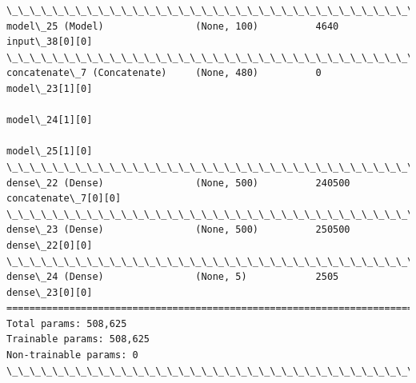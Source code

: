 \documentclass[11pt]{article}
\begin{document}
\begin{Verbatim}[commandchars=\\\{\}]
\_\_\_\_\_\_\_\_\_\_\_\_\_\_\_\_\_\_\_\_\_\_\_\_\_\_\_\_\_\_\_\_\_\_\_\_\_\_\_\_\_\_\_\_\_\_\_\_\_\_\_\_\_\_\_\_\_\_\_\_\_\_\_\_\_\_\_\_\_\_\_\_\_\_\_\_\_\_\_\_\_\_\_\_\_\_\_\_\_\_\_\_\_\_\_\_\_\_
model\_25 (Model)                (None, 100)          4640        input\_38[0][0]                   
\_\_\_\_\_\_\_\_\_\_\_\_\_\_\_\_\_\_\_\_\_\_\_\_\_\_\_\_\_\_\_\_\_\_\_\_\_\_\_\_\_\_\_\_\_\_\_\_\_\_\_\_\_\_\_\_\_\_\_\_\_\_\_\_\_\_\_\_\_\_\_\_\_\_\_\_\_\_\_\_\_\_\_\_\_\_\_\_\_\_\_\_\_\_\_\_\_\_
concatenate\_7 (Concatenate)     (None, 480)          0           model\_23[1][0]                   
                                                                 model\_24[1][0]                   
                                                                 model\_25[1][0]                   
\_\_\_\_\_\_\_\_\_\_\_\_\_\_\_\_\_\_\_\_\_\_\_\_\_\_\_\_\_\_\_\_\_\_\_\_\_\_\_\_\_\_\_\_\_\_\_\_\_\_\_\_\_\_\_\_\_\_\_\_\_\_\_\_\_\_\_\_\_\_\_\_\_\_\_\_\_\_\_\_\_\_\_\_\_\_\_\_\_\_\_\_\_\_\_\_\_\_
dense\_22 (Dense)                (None, 500)          240500      concatenate\_7[0][0]              
\_\_\_\_\_\_\_\_\_\_\_\_\_\_\_\_\_\_\_\_\_\_\_\_\_\_\_\_\_\_\_\_\_\_\_\_\_\_\_\_\_\_\_\_\_\_\_\_\_\_\_\_\_\_\_\_\_\_\_\_\_\_\_\_\_\_\_\_\_\_\_\_\_\_\_\_\_\_\_\_\_\_\_\_\_\_\_\_\_\_\_\_\_\_\_\_\_\_
dense\_23 (Dense)                (None, 500)          250500      dense\_22[0][0]                   
\_\_\_\_\_\_\_\_\_\_\_\_\_\_\_\_\_\_\_\_\_\_\_\_\_\_\_\_\_\_\_\_\_\_\_\_\_\_\_\_\_\_\_\_\_\_\_\_\_\_\_\_\_\_\_\_\_\_\_\_\_\_\_\_\_\_\_\_\_\_\_\_\_\_\_\_\_\_\_\_\_\_\_\_\_\_\_\_\_\_\_\_\_\_\_\_\_\_
dense\_24 (Dense)                (None, 5)            2505        dense\_23[0][0]                   
==================================================================================================
Total params: 508,625
Trainable params: 508,625
Non-trainable params: 0
\_\_\_\_\_\_\_\_\_\_\_\_\_\_\_\_\_\_\_\_\_\_\_\_\_\_\_\_\_\_\_\_\_\_\_\_\_\_\_\_\_\_\_\_\_\_\_\_\_\_\_\_\_\_\_\_\_\_\_\_\_\_\_\_\_\_\_\_\_\_\_\_\_\_\_\_\_\_\_\_\_\_\_\_\_\_\_\_\_\_\_\_\_\_\_\_\_\_

    \end{Verbatim}

    \begin{center}
    \end{center}
    { \hspace*{\fill} \\}
    
    \begin{center}
    \end{center}
    { \hspace*{\fill} \\}
    
\end{document}

